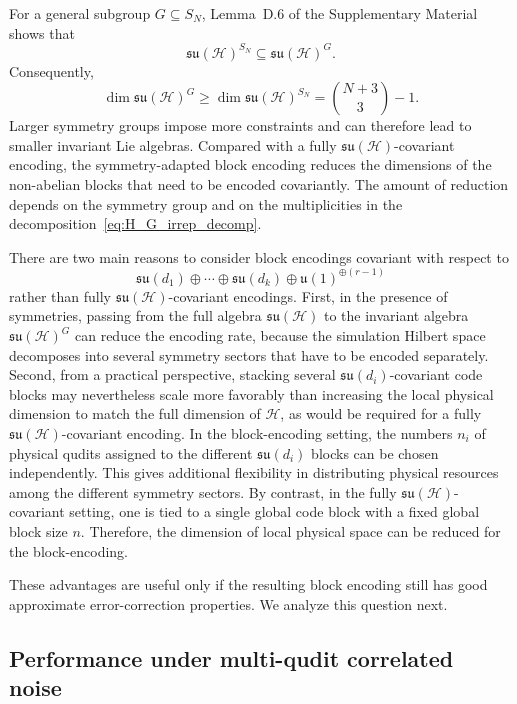 \documentclass[10pt,twocolumn,superscriptaddress,aps,amsmath,amssymb,citeautoscript,floatfix,prx,longbibliography]{revtex4-2}
\newcounter{alg}
\theoremstyle{plain}
\theoremstyle{plain}
\theoremstyle{plain}
\theoremstyle{plain}
\theoremstyle{plain}
\theoremstyle{plain}
\begin{document}
For a general subgroup $G\subseteq S_N$, Lemma~D.6 of the Supplementary Material~\cite{SuppMat} shows that
$$
    \mathfrak{su}(\mathcal H)^{S_N}
    \subseteq
    \mathfrak{su}(\mathcal H)^G .
$$
Consequently,
\begin{equation}\label{eq:inv_alg_dim}
    \dim\mathfrak{su}(\mathcal H)^G
    \ge
    \dim\mathfrak{su}(\mathcal H)^{S_N}
    =
    \binom{N+3}{3}
    -
    1 .
\end{equation}
Larger symmetry groups impose more constraints and can therefore lead to smaller invariant Lie algebras. Compared with a fully $\mathfrak{su}(\mathcal H)$-covariant encoding, the symmetry-adapted block encoding reduces the dimensions of the non-abelian blocks that need to be encoded covariantly. The amount of reduction depends on the symmetry group and on the multiplicities in the decomposition~\eqref{eq:H_G_irrep_decomp}.

There are two main reasons to consider block encodings covariant with respect to
$$
    \mathfrak{su}(d_1)
    \oplus
    \cdots
    \oplus
    \mathfrak{su}(d_k)
    \oplus
    \mathfrak{u}(1)^{\oplus(r-1)}
$$
rather than fully $\mathfrak{su}(\mathcal H)$-covariant encodings. First, in the presence of symmetries, passing from the full algebra $\mathfrak{su}(\mathcal H)$ to the invariant algebra $\mathfrak{su}(\mathcal H)^G$ can reduce the encoding rate, because the simulation Hilbert space decomposes into several symmetry sectors that have to be encoded separately. Second, from a practical perspective, stacking several $\mathfrak{su}(d_i)$-covariant code blocks may nevertheless scale more favorably than increasing the local physical dimension to match the full dimension of $\mathcal H$, as would be required for a fully $\mathfrak{su}(\mathcal H)$-covariant encoding. In the block-encoding setting, the numbers $n_i$ of physical qudits assigned to the different $\mathfrak{su}(d_i)$ blocks can be chosen independently. This gives additional flexibility in distributing physical resources among the different symmetry sectors. By contrast, in the fully $\mathfrak{su}(\mathcal H)$-covariant setting, one is tied to a single global code block with a fixed global block size $n$. Therefore, the dimension of local physical space can be reduced for the block-encoding.

These advantages are useful only if the resulting block encoding still has good approximate error-correction properties. We analyze this question next.

\subsection{Performance under multi-qudit correlated noise}\label{subsec:main_covar_analog_noise}
\end{document}
